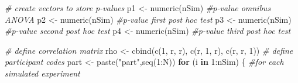 \documentclass[
]{book}
\newenvironment{Shaded}{\begin{snugshade}}{\end{snugshade}}
\newcommand{\CommentTok}[1]{\textcolor[rgb]{0.56,0.35,0.01}{\textit{#1}}}
\newcommand{\ControlFlowTok}[1]{\textcolor[rgb]{0.13,0.29,0.53}{\textbf{#1}}}
\newcommand{\DecValTok}[1]{\textcolor[rgb]{0.00,0.00,0.81}{#1}}
\newcommand{\FunctionTok}[1]{\textcolor[rgb]{0.00,0.00,0.00}{#1}}
\newcommand{\NormalTok}[1]{#1}
\newcommand{\OtherTok}[1]{\textcolor[rgb]{0.56,0.35,0.01}{#1}}
\newcommand{\SpecialCharTok}[1]{\textcolor[rgb]{0.00,0.00,0.00}{#1}}
\newcommand{\StringTok}[1]{\textcolor[rgb]{0.31,0.60,0.02}{#1}}
\begin{document}
\begin{Shaded}
\begin{Highlighting}[]
\CommentTok{\# create vectors to store p{-}values}
\NormalTok{p1 }\OtherTok{\textless{}{-}} \FunctionTok{numeric}\NormalTok{(nSim) }\CommentTok{\#p{-}value omnibus ANOVA}
\NormalTok{p2 }\OtherTok{\textless{}{-}} \FunctionTok{numeric}\NormalTok{(nSim) }\CommentTok{\#p{-}value first post hoc test}
\NormalTok{p3 }\OtherTok{\textless{}{-}} \FunctionTok{numeric}\NormalTok{(nSim) }\CommentTok{\#p{-}value second post hoc test}
\NormalTok{p4 }\OtherTok{\textless{}{-}} \FunctionTok{numeric}\NormalTok{(nSim) }\CommentTok{\#p{-}value third post hoc test}

\CommentTok{\# define correlation matrix}
\NormalTok{rho }\OtherTok{\textless{}{-}} \FunctionTok{cbind}\NormalTok{(}\FunctionTok{c}\NormalTok{(}\DecValTok{1}\NormalTok{, r, r), }\FunctionTok{c}\NormalTok{(r, }\DecValTok{1}\NormalTok{, r), }\FunctionTok{c}\NormalTok{(r, r, }\DecValTok{1}\NormalTok{))}
\CommentTok{\# define participant codes}
\NormalTok{part }\OtherTok{\textless{}{-}} \FunctionTok{paste}\NormalTok{(}\StringTok{"part"}\NormalTok{,}\FunctionTok{seq}\NormalTok{(}\DecValTok{1}\SpecialCharTok{:}\NormalTok{N))}
\ControlFlowTok{for}\NormalTok{ (i }\ControlFlowTok{in} \DecValTok{1}\SpecialCharTok{:}\NormalTok{nSim) \{}
  \CommentTok{\#for each simulated experiment}


\end{Highlighting}
\end{Shaded}
\end{document}
